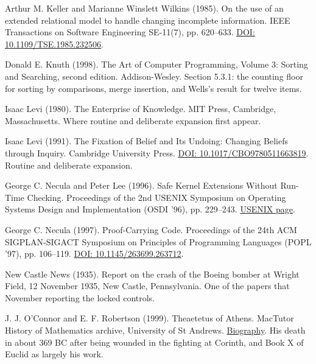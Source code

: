\documentclass[11pt,twoside]{article}
\theoremstyle{thielethm}
\theoremstyle{thieledef}
\theoremstyle{thieledef}
\theoremstyle{thieledef}
\theoremstyle{thielethm}
\theoremstyle{thieleobs}
\theoremstyle{thielethm}
\begin{document}
\noindent Arthur M. Keller and Marianne Winslett Wilkins (1985). On the use of an extended relational model to handle changing incomplete information. IEEE Transactions on Software Engineering SE-11(7), pp. 620--633. \href{https://doi.org/10.1109/TSE.1985.232506}{DOI: 10.1109/TSE.1985.232506}.
\par\medskip

\noindent Donald E. Knuth (1998). The Art of Computer Programming, Volume 3: Sorting and Searching, second edition. Addison-Wesley. Section 5.3.1: the counting floor for sorting by comparisons, merge insertion, and Wells's result for twelve items.
\par\medskip

\noindent Isaac Levi (1980). The Enterprise of Knowledge. MIT Press, Cambridge, Massachusetts. Where routine and deliberate expansion first appear.
\par\medskip

\noindent Isaac Levi (1991). The Fixation of Belief and Its Undoing: Changing Beliefs through Inquiry. Cambridge University Press. \href{https://doi.org/10.1017/CBO9780511663819}{DOI: 10.1017/CBO9780511663819}. Routine and deliberate expansion.
\par\medskip

\noindent George C. Necula and Peter Lee (1996). Safe Kernel Extensions Without Run-Time Checking. Proceedings of the 2nd USENIX Symposium on Operating Systems Design and Implementation (OSDI '96), pp. 229--243. \href{https://www.usenix.org/conference/osdi-96/safe-kernel-extensions-without-run-time-checking}{USENIX page}.
\par\medskip

\noindent George C. Necula (1997). Proof-Carrying Code. Proceedings of the 24th ACM SIGPLAN-SIGACT Symposium on Principles of Programming Languages (POPL '97), pp. 106--119. \href{https://doi.org/10.1145/263699.263712}{DOI: 10.1145/263699.263712}.
\par\medskip

\noindent New Castle News (1935). Report on the crash of the Boeing bomber at Wright Field, 12 November 1935, New Castle, Pennsylvania. One of the papers that November reporting the locked controls.
\par\medskip

\noindent J. J. O'Connor and E. F. Robertson (1999). Theaetetus of Athens. MacTutor History of Mathematics archive, University of St Andrews. \href{https://mathshistory.st-andrews.ac.uk/Biographies/Theaetetus/}{Biography}. His death in about 369 BC after being wounded in the fighting at Corinth, and Book X of Euclid as largely his work.
\par\medskip
\end{document}
